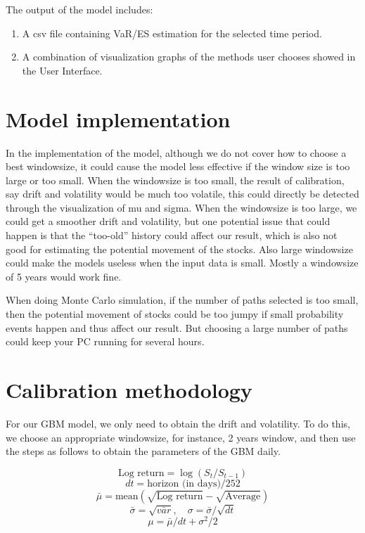 \documentclass[letterpaper,11pt, oneside]{layout}
\begin{document}
The output of the model includes:
\begin{enumerate}
\item A csv file containing VaR/ES estimation for the selected time period.
\item A combination of visualization graphs of the methods user chooses showed in the User Interface.
\end{enumerate}

\section{Model implementation}
\label{sec:md:mi}

In the implementation of the model, although we do not cover how to choose a best windowsize, it could cause the model less effective if the window size is too large or too small. When the windowsize is too small, the result of calibration, say drift and volatility would be much too volatile, this could directly be detected through the visualization of mu and sigma. When the windowsize is too large, we could get a smoother drift and volatility, but one potential issue that could happen is that the “too-old” history could affect our result, which is also not good for estimating the potential movement of the stocks. Also large windowsize could make the models useless when the input data is small. Mostly a windowsize of 5 years would work fine.


When doing Monte Carlo simulation, if the number of paths selected is too small, then the potential movement of stocks could be too jumpy if small probability events happen and thus affect our result. But choosing a large number of paths could keep your PC running for several hours.

\section{Calibration methodology}
\label{sec:md:cm}


For our GBM model, we only need to obtain the drift and volatility. To do this, we choose an appropriate windowsize, for instance, 2 years window, and then use the steps as follows to obtain the parameters of the GBM daily. 

\[\text{Log return}=\log(S_t/S_{t-1})\]
\[dt=\text{horizon (in days)}/252\]
\[\bar{\mu}=\text{mean}(\sqrt{\text{Log return}}-\sqrt{\text{Average}})\]
\[\bar{\sigma}=\sqrt{\bar{var}}, \quad \sigma=\bar{\sigma}/\sqrt{dt}\]
\[\mu=\bar{\mu}/dt+\sigma^2/2\]
\end{document}
